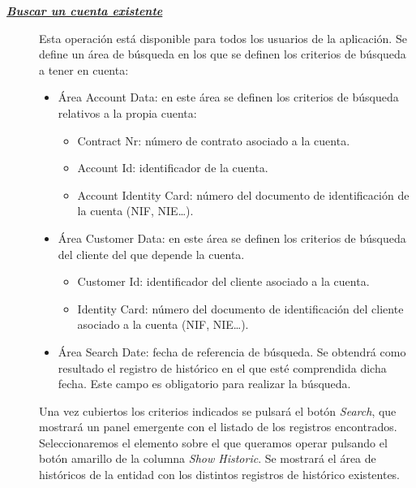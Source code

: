 \begin{description}
\item[\underline{\textsl{\textbf{Buscar un cuenta existente}}}] Esta operación está disponible para todos los usuarios de la aplicación.
Se define un área de búsqueda en los que se definen los criterios de búsqueda a tener en cuenta:
\begin{itemize}
	\item Área Account Data: en este área se definen los criterios de búsqueda relativos a la propia cuenta:
	\begin{itemize}
		\item Contract Nr: número de contrato asociado a la cuenta.
		\item Account Id: identificador de la cuenta.
		\item Account Identity Card: número del documento de identificación de la cuenta (NIF, NIE\dots).
	\end{itemize}
	\item Área Customer Data: en este área se definen los criterios de búsqueda del cliente del que depende la cuenta.
	\begin{itemize}
		\item Customer Id: identificador del cliente asociado a la cuenta.
		\item Identity Card: número del documento de identificación del cliente asociado a la cuenta (NIF, NIE\dots).
	\end{itemize}
	\item Área Search Date: fecha de referencia de búsqueda. Se obtendrá como resultado el registro de histórico en el que esté comprendida dicha fecha. Este campo es obligatorio para realizar la búsqueda.
\end{itemize}

Una vez cubiertos los criterios indicados se pulsará el botón \emph{Search}, que mostrará un panel emergente con el listado de los registros encontrados. Seleccionaremos el elemento sobre el que queramos operar pulsando el botón amarillo de la columna \emph{Show Historic}. Se mostrará el área de históricos de la entidad con los distintos registros de histórico existentes.



\end{description}
